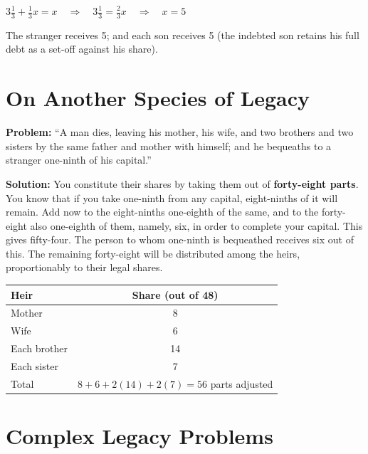 \documentclass[11pt,a4paper]{book}
\begin{document}
\begin{mathbox}
$3\tfrac{1}{3} + \tfrac{1}{3}x = x \quad\Rightarrow\quad 3\tfrac{1}{3} = \tfrac{2}{3}x \quad\Rightarrow\quad x = 5$
\end{mathbox}

The stranger receives 5; and each son receives 5 (the indebted son retains
his full debt as a set-off against his share).

\section*{On Another Species of Legacy}

\textbf{Problem:} ``A man dies, leaving his mother, his wife, and two
brothers and two sisters by the same father and mother with himself; and he
bequeaths to a stranger one-ninth of his capital.''

\textbf{Solution:} You constitute their shares by taking them out of
\textbf{forty-eight parts}. You know that if you take one-ninth from any
capital, eight-ninths of it will remain. Add now to the eight-ninths
one-eighth of the same, and to the forty-eight also one-eighth of them,
namely, six, in order to complete your capital. This gives fifty-four. The
person to whom one-ninth is bequeathed receives six out of this. The
remaining forty-eight will be distributed among the heirs, proportionably to
their legal shares.

\begin{mathbox}
\begin{center}
\begin{tabular}{l|c}
\textbf{Heir} & \textbf{Share (out of 48)} \\
\hline
Mother & 8 \\
Wife & 6 \\
Each brother & 14 \\
Each sister & 7 \\
\hline
Total & $8 + 6 + 2(14) + 2(7) = 56$ parts adjusted \\
\end{tabular}
\end{center}
\end{mathbox}

\section*{Complex Legacy Problems}
\end{document}
